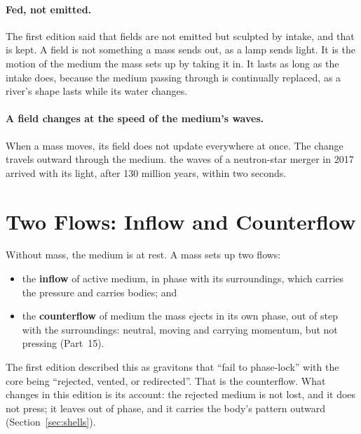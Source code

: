 \documentclass[11pt,a4paper]{article}
\begin{document}
\paragraph{Fed, not emitted.} The first edition said that fields are not emitted but sculpted by intake, and that is kept. A field is not something a mass sends out, as a lamp sends light. It is the motion of the medium the mass sets up by taking it in. It lasts as long as the intake does, because the medium passing through is continually replaced, as a river's shape lasts while its water changes.

\paragraph{A field changes at the speed of the medium's waves.} When a mass moves, its field does not update everywhere at once. The change travels outward through the medium.  the waves of a neutron-star merger in 2017 arrived with its light, after 130 million years, within two seconds.

\section{Two Flows: Inflow and Counterflow}
\label{sec:flows}

\begin{hypbar}
Without mass, the medium is at rest. A mass sets up two flows:
\begin{itemize}
\item the \textbf{inflow} of active medium, in phase with its surroundings, which carries the pressure and carries bodies; and
\item the \textbf{counterflow} of medium the mass ejects in its own phase, out of step with the surroundings: neutral, moving and carrying momentum, but not pressing (Part~15).
\end{itemize}
\end{hypbar}

The first edition described this as gravitons that ``fail to phase-lock'' with the core being ``rejected, vented, or redirected''. That is the counterflow. What changes in this edition is its account: the rejected medium is not lost, and it does not press; it leaves out of phase, and it carries the body's pattern outward (Section~\ref{sec:shells}).
\end{document}

